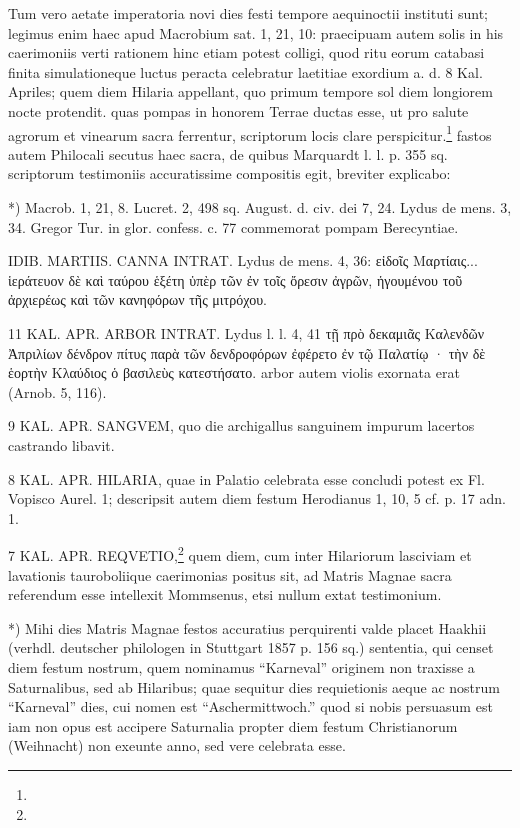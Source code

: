 \documentclass[a4paper, 11pt, oneside, polutonikogreek, german]{article}
\begin{document}
Tum vero aetate imperatoria novi dies festi tempore aequinoctii instituti sunt; legimus enim haec apud Macrobium sat. 1, 21, 10: praecipuam autem solis in his caerimoniis verti rationem hinc etiam potest colligi, quod ritu eorum catabasi finita simulationeque luctus peracta celebratur laetitiae exordium a. d. 8 Kal. Apriles; quem diem Hilaria appellant, quo primum tempore sol diem longiorem nocte protendit. quas pompas in honorem Terrae ductas esse, ut pro salute agrorum et vinearum sacra ferrentur, scriptorum locis clare perspicitur.\footnote{} fastos autem Philocali secutus haec sacra, de quibus Marquardt l. l. p. 355 sq. scriptorum testimoniis accuratissime compositis egit, breviter explicabo:

*) Macrob. 1, 21, 8. Lucret. 2, 498 sq. August. d. civ. dei 7, 24. Lydus de mens. 3, 34. Gregor Tur. in glor. confess. c. 77 commemorat pompam Berecyntiae.

IDIB. MARTIIS. CANNA INTRAT. Lydus de mens. 4, 36: εἰδοῖς Μαρτίαις... ἱεράτευον δὲ καὶ ταύρου ἑξέτη ὑπὲρ τῶν ἐν τοῖς ὄρεσιν ἀγρῶν, ἡγουμένου τοῦ ἀρχιερέως καὶ τῶν κανηφόρων τῆς μιτρόχου.

11 KAL. APR. ARBOR INTRAT. Lydus l. l. 4, 41 τῇ πρὸ δεκαμιᾶς Καλενδῶν Ἀπριλίων δένδρον πίτυς παρὰ τῶν δενδροφόρων ἐφέρετο ἐν τῷ Παλατίῳ · τὴν δὲ ἑορτὴν Κλαύδιος ὁ βασιλεὺς κατεστήσατο. arbor autem violis exornata erat (Arnob. 5, 116).

9 KAL. APR. SANGVEM, quo die archigallus sanguinem impurum lacertos castrando libavit.

8 KAL. APR. HILARIA, quae in Palatio celebrata esse concludi potest ex Fl. Vopisco Aurel. 1; descripsit autem diem festum Herodianus 1, 10, 5 cf. p. 17 adn. 1.

7 KAL. APR. REQVETIO,\footnote{} quem diem, cum inter Hilariorum lasciviam et lavationis tauroboliique caerimonias positus sit, ad Matris Magnae sacra referendum esse intellexit Mommsenus, etsi nullum extat testimonium.

*) Mihi dies Matris Magnae festos accuratius perquirenti valde placet Haakhii (verhdl. deutscher philologen in Stuttgart 1857 p. 156 sq.) sententia, qui censet diem festum nostrum, quem nominamus "`Karneval"' originem non traxisse a Saturnalibus, sed ab Hilaribus; quae sequitur dies requietionis aeque ac nostrum "`Karneval"' dies, cui nomen est "`Aschermittwoch."' quod si nobis persuasum est iam non opus est accipere Saturnalia propter diem festum Christianorum (Weihnacht) non exeunte anno, sed vere celebrata esse.
\end{document}

